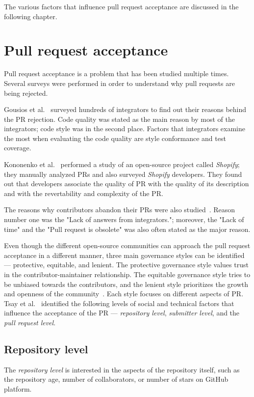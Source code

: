 \documentclass[digital,oneside,oldtable,nolof,nolot,nocover]{fithesis4}
\begin{document}
The various factors that influence pull request acceptance are discussed in the
following chapter.
\chapter{Pull request acceptance}
\label{sec:org747ca66}
Pull request acceptance is a problem that has been studied multiple
times. Several surveys were performed in order to understand why pull requests
are being rejected.

Gousios et al.~\cite{integrator} surveyed hundreds of integrators to find out
their reasons behind the PR rejection. Code quality was stated as the main
reason by most of the integrators; code style was in the second place.
Factors that integrators examine the most when evaluating the code quality are
style conformance and test coverage.

Kononenko et al.~\cite{shopify} performed a study of an open-source project
called \emph{Shopify}; they manually analyzed PRs and also surveyed \emph{Shopify}
developers. They found out that developers associate the quality of PR with
the quality of its description and with the revertability and complexity of
the PR.

The reasons why contributors abandon their PRs were also
studied~\cite{abandonment}. Reason number one was the "Lack of answers from
integrators."; moreover, the "Lack of time" and the "Pull request is
obsolete" was also often stated as the major reason.

Even though the different open-source communities can approach the pull request acceptance in
a different manner, three main governance styles can be
identified --- protective, equitable, and lenient. The protective governance style
values trust in the contributor-maintainer relationship. The equitable
governance style tries to be unbiased towards the contributors, and the
lenient style prioritizes the growth and openness of the community~\cite{foss}.
Each style focuses on different aspects of PR. Tsay et al.~\cite{social}
identified the following levels of social and technical factors that influence
the acceptance of the PR --- \emph{repository level}, \emph{submitter level}, and the
\emph{pull request level}.
\section{Repository level}
\label{sec:org1ecb713}
The \emph{repository level} is interested in the aspects of the repository itself,
such as the repository age, number of collaborators, or number of stars on
GitHub platform.
\end{document}
